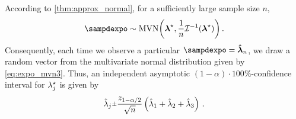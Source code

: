 \documentclass[../main.tex]{subfiles}
\begin{document}
According to \cref{thm:approx_normal}, for a sufficiently large sample size $n$,
\begin{equation}
\label{eq:expo_mvn3}
    \sampdexpo \sim \mathrm{MVN}\biggl(\tparam{\vec\lambda}, \frac{1}{n}\infomatrx^{-1}(\tparam{\vec\lambda})\biggr)\,.
\end{equation}
Consequently, each time we observe a particular $\sampdexpo = \expomle$, we draw a random vector from the multivariate normal distribution given by \cref{eq:expo_mvn3}. Thus, an independent asymptotic $(1-\alpha) \cdot 100 \%$-confidence interval for ${\lambda}^{\star}_j$ is given by
\begin{equation}
    \estimator{\lambda}_j \raisebox{.2ex}{$\scriptstyle\pm$} \frac{z_{1 - \alpha/2}}{\sqrt n}
    \left (
        \estimator{\lambda}_1 + \estimator{\lambda}_2 + \estimator{\lambda}_3
    \right)\,.
\end{equation}
\end{document}
